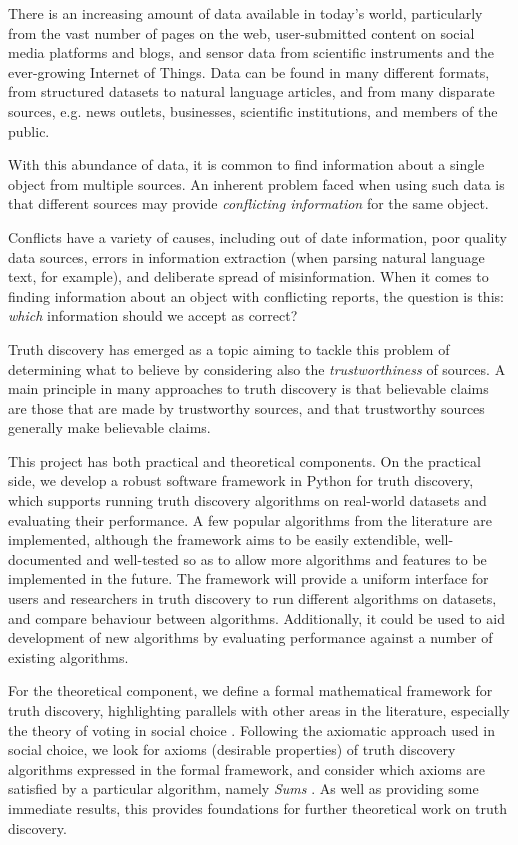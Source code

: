 \documentclass[../main.tex]{subfiles}
\begin{document}
There is an increasing amount of data available in today's world, particularly
from the vast number of pages on the web, user-submitted content on social
media platforms and blogs, and sensor data from scientific instruments and the
ever-growing Internet of Things. Data can be found in many different formats,
from structured datasets to natural language articles, and from many disparate
sources, e.g. news outlets, businesses, scientific institutions, and members of
the public.

With this abundance of data, it is common to find information about a single
object from multiple sources. An inherent problem faced when using such data is
that different sources may provide \emph{conflicting information} for the same
object.

Conflicts have a variety of causes, including out of date information, poor
quality data sources, errors in information extraction (when parsing natural
language text, for example), and deliberate spread of misinformation. When it
comes to finding information about an object with conflicting reports, the
question is this: \emph{which} information should we accept as correct?

Truth discovery has emerged as a topic aiming to tackle this problem of
determining what to believe by considering also the \emph{trustworthiness} of
sources. A main principle in many approaches to truth discovery is that
believable claims are those that are made by trustworthy sources, and that
trustworthy sources generally make believable claims.

This project has both practical and theoretical components. On the practical
side, we develop a robust software framework in Python for truth discovery,
which supports running truth discovery algorithms on real-world datasets and
evaluating their performance. A few popular algorithms from the literature are
implemented, although the framework aims to be easily extendible,
well-documented and well-tested so as to allow more algorithms and features to
be implemented in the future. The framework will provide a uniform interface
for users and researchers in truth discovery to run different algorithms on
datasets, and compare behaviour between algorithms. Additionally, it could be
used to aid development of new algorithms by evaluating performance against a
number of existing algorithms.

For the theoretical component, we define a formal mathematical framework for
truth discovery, highlighting parallels with other areas in the literature,
especially the theory of voting in social choice \cite{handbook_voting}.
Following the axiomatic approach used in social choice, we look for axioms
(desirable properties) of truth discovery algorithms expressed in the formal
framework, and consider which axioms are satisfied by a particular algorithm,
namely \emph{Sums} \cite{pasternack}. As well as providing some immediate
results, this provides foundations for further theoretical work on truth
discovery.

\end{document}
